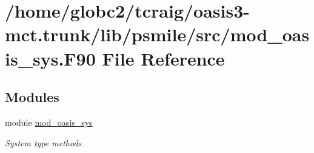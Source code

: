 \hypertarget{mod__oasis__sys_8_f90}{}\section{/home/globc2/tcraig/oasis3-\/mct.trunk/lib/psmile/src/mod\+\_\+oasis\+\_\+sys.F90 File Reference}
\label{mod__oasis__sys_8_f90}
\subsection*{Modules}
\begin{DoxyCompactItemize}
\item 
module \hyperlink{namespacemod__oasis__sys}{mod\+\_\+oasis\+\_\+sys}
\begin{DoxyCompactList}\small\item\em System type methods. \end{DoxyCompactList}\end{DoxyCompactItemize}
